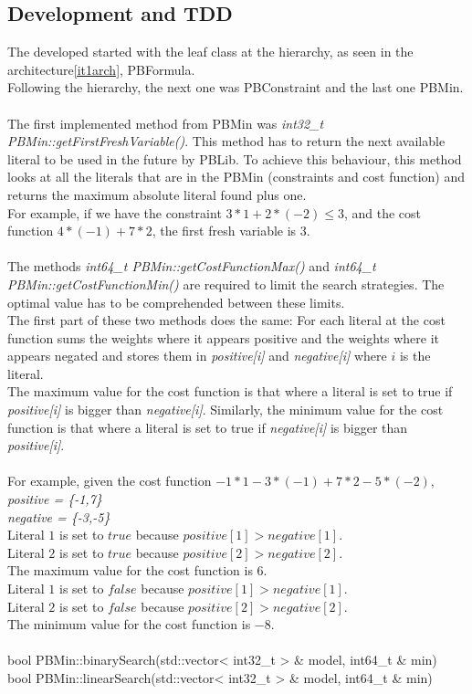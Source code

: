 \subsection{Development and TDD}

The developed started with the leaf class at the hierarchy, as seen in the architecture\ref{it1arch}, PBFormula.  \\
Following the hierarchy, the next one was PBConstraint and the last one PBMin. \\\\
The first implemented method from PBMin was \emph{int32\_t PBMin::getFirstFreshVariable()}. This method has to return the next available literal to be used in the future by PBLib. To achieve this behaviour, this method looks at all the literals that are in the PBMin (constraints and cost function) and returns the maximum absolute literal found plus one.  \\
For example, if we have the constraint $3*1 + 2*(-2) \leq 3$, and the cost function $4*(-1) + 7*2$, the first fresh variable is 3. \\\\
The methods \emph{int64\_t PBMin::getCostFunctionMax()} and \emph{int64\_t PBMin::getCostFunctionMin()} are required to limit the search strategies. The optimal value has to be comprehended between these limits.  \\
The first part of these two methods does the same: For each literal at the cost function sums the weights where it appears positive and the weights where it appears negated and stores them in \emph{positive[i]} and \emph{negative[i]} where $i$ is the literal.\\
The maximum value for the cost function is that where a literal is set to true if \emph{positive[i]} is bigger than \emph{negative[i]}. Similarly, the minimum value for the cost function is that where a literal is set to true if \emph{negative[i]} is bigger than \emph{positive[i]}.\\\\
For example, given the cost function $-1*1 - 3*(-1) + 7*2 -5*(-2)$,\\
\emph{positive = \{-1,7\}}\\
\emph{negative = \{-3,-5\}}\\
Literal $1$ is set to $true$ because $positive[1] > negative[1]$.\\
Literal $2$ is set to $true$ because $positive[2] > negative[2]$.\\
The maximum value for the cost function is $6$.\\
Literal $1$ is set to $false$ because $positive[1] > negative[1]$.\\
Literal $2$ is set to $false$ because $positive[2] > negative[2]$.\\
The minimum value for the cost function is $-8$.\\\\
bool PBMin::binarySearch(std::vector< int32\_t > \& model, int64\_t \& min) \\
bool PBMin::linearSearch(std::vector< int32\_t > \& model, int64\_t \& min) 

